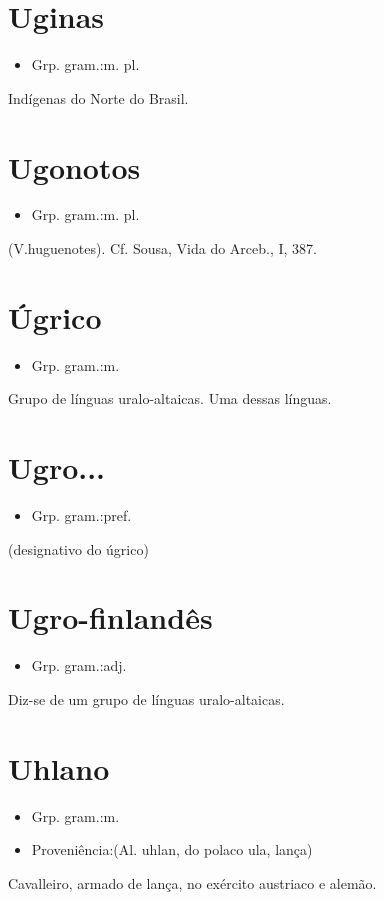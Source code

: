 \documentclass{article}
\begin{document}
\section{Uginas}
\begin{itemize}
\item {Grp. gram.:m. pl.}
\end{itemize}
Indígenas do Norte do Brasil.
\section{Ugonotos}
\begin{itemize}
\item {Grp. gram.:m. pl.}
\end{itemize}
(V.huguenotes). Cf. Sousa, \textunderscore Vida do Arceb.\textunderscore , I, 387.
\section{Úgrico}
\begin{itemize}
\item {Grp. gram.:m.}
\end{itemize}
Grupo de línguas uralo-altaicas.
Uma dessas línguas.
\section{Ugro...}
\begin{itemize}
\item {Grp. gram.:pref.}
\end{itemize}
(designativo do \textunderscore úgrico\textunderscore )
\section{Ugro-finlandês}
\begin{itemize}
\item {Grp. gram.:adj.}
\end{itemize}
Diz-se de um grupo de línguas uralo-altaicas.
\section{Uhlano}
\begin{itemize}
\item {Grp. gram.:m.}
\end{itemize}
\begin{itemize}
\item {Proveniência:(Al. \textunderscore uhlan\textunderscore , do polaco \textunderscore ula\textunderscore , lança)}
\end{itemize}
Cavalleiro, armado de lança, no exército austriaco e alemão.
\end{document}
